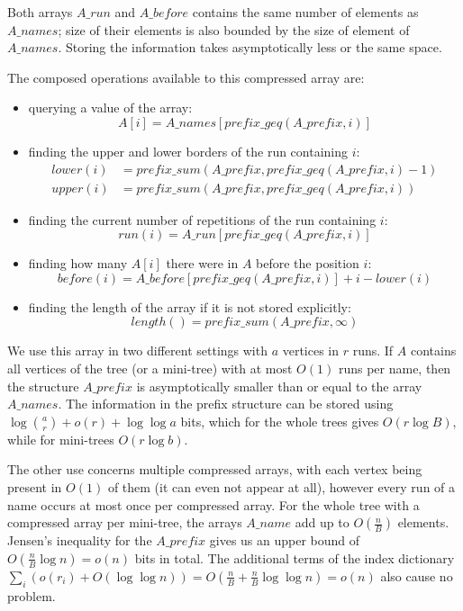 Both arrays $A\_run$ and $A\_before$ contains the same number of elements as $A\_names$; size of their elements is also bounded by the size of element of $A\_names$.
Storing the information takes asymptotically less or the same space.

The composed operations available to this compressed array are:
\begin{itemize}
	\item querying a value of the array:
		$$A[i] = A\_names[prefix\_geq(A\_prefix, i)]$$
	\item finding the upper and lower borders of the run containing $i$: 
	\begin{align*}
		lower(i) &= prefix\_sum(A\_prefix, prefix\_geq(A\_prefix, i) - 1) \\
		upper(i) &= prefix\_sum(A\_prefix, prefix\_geq(A\_prefix, i))
	\end{align*} 
	\item finding the current number of repetitions of the run containing $i$:
	$$ run(i) = A\_run[prefix\_geq(A\_prefix, i)] $$
	\item finding how many $A[i]$ there were in $A$ before the position $i$:
	$$ before(i) = A\_before[prefix\_geq(A\_prefix, i)] + i - lower(i) $$
	\item finding the length of the array if it is not stored explicitly:
	$$ length() = prefix\_sum(A\_prefix, \infty)$$
\end{itemize}

We use this array in two different settings with $a$ vertices in $r$ runs.
If $A$ contains all vertices of the tree (or a mini-tree) with at most $O(1)$ runs per name, then the structure $A\_prefix$ is asymptotically smaller than or equal to the array $A\_names$.
The information in the prefix structure can be stored using $\log {a \choose r} + o(r) + \log \log a$ bits, which for the whole trees gives $O(r \log B)$, while for mini-trees $O(r \log b)$.

The other use concerns multiple compressed arrays, with each vertex being present in $O(1)$ of them (it can even not appear at all), however every run of a name occurs at most once per compressed array.
For the whole tree with a compressed array per mini-tree, the arrays $A\_name$ add up to $O(\frac{n}{B})$ elements.
Jensen's inequality for the $A\_prefix$ gives us an upper bound of $O(\frac{n}{B} \log n) = o(n)$ bits in total.
The additional terms of the index dictionary $\sum_i (o(r_i) + O(\log \log n)) = O(\frac{n}{B} + \frac{n}{B} \log \log n) = o(n)$ also cause no problem.

